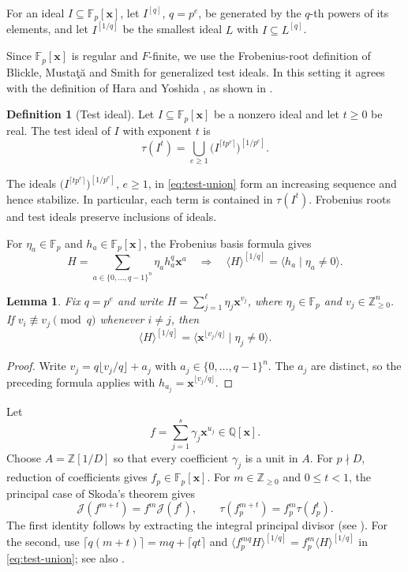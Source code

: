 \documentclass[11pt]{amsart}
\numberwithin{equation}{section}
\newtheorem{lemma}[theorem]{Lemma}
\theoremstyle{definition}
\newtheorem{definition}[theorem]{Definition}
\newcommand{\J}{\mathcal J}
\newcommand{\Q}{\mathbb Q}
\newcommand{\Z}{\mathbb Z}
\newcommand{\F}{\mathbb F}
\newcommand{\xx}{\boldsymbol{x}}
\begin{document}
For an ideal $I\subseteq \F_p[\xx]$, let
$I^{[q]}$, $q=p^e$, be generated by the $q$-th powers of its elements, and let
$I^{[1/q]}$ be the smallest ideal $L$ with $I\subseteq L^{[q]}$.

Since $\F_p[\xx]$ is regular and $F$-finite, we use the
Frobenius-root definition of Blickle, Musta\c{t}\u{a} and Smith
\cite[Definition~2.9]{BMS} for generalized test ideals. 
In this setting it agrees with the definition of Hara and Yoshida \cite{HY}, as shown in
\cite[Proposition~2.22]{BMS}.

\begin{definition}[Test ideal]
Let $I\subseteq \F_p[\xx]$ be a nonzero ideal and let $t\ge0$ be real.
The test ideal of $I$ with exponent $t$ is
\begin{equation}\label{eq:test-union}
 \tau(I^t)=\bigcup_{e\ge1}
          \bigl(I^{\lceil tp^e\rceil}\bigr)^{[1/p^e]}.
\end{equation}
\end{definition}
The ideals $\bigl(I^{\lceil tp^e\rceil}\bigr)^{[1/p^e]}$, $e\ge 1$, in \eqref{eq:test-union} form an increasing sequence and hence
stabilize. In particular, each term is contained in $\tau(I^t)$.
Frobenius roots and test ideals preserve inclusions of ideals.

For $\eta_a\in\F_p$ and $h_a\in\F_p[\xx]$, the Frobenius basis formula
\cite[Proposition~2.5]{BMS} gives
\[
 H=\sum_{a\in\{0,\ldots,q-1\}^n}\eta_a h_a^q\xx^a
 \quad\Longrightarrow\quad
 \langle H\rangle^{[1/q]}=\langle h_a\mid\eta_a\ne0\rangle.
\]

\begin{lemma}\label{lem:froot}
Fix $q=p^e$ and write $H=\sum_{j=1}^{\ell}\eta_j\xx^{v_j}$,
where $\eta_j\in\F_p$ and $v_j\in\Z_{\ge 0}^n$.
If $v_i\not\equiv v_j\pmod q$ whenever $i\ne j$, then
\[
 \langle H\rangle^{[1/q]}
 =\langle \xx^{\lfloor v_j/q\rfloor}\mid \eta_j\ne0\rangle.
\]
\end{lemma}

\begin{proof}
Write $v_j=q\lfloor v_j/q\rfloor+a_j$ with $a_j\in\{0,\ldots,q-1\}^n$.
The $a_j$ are distinct, so the preceding formula applies with
$h_{a_j}=\xx^{\lfloor v_j/q\rfloor}$.
\end{proof}

Let
\begin{equation}\label{eq:f}
f=\sum_{j=1}^s\gamma_j\xx^{u_j}\in\Q[\xx].
\end{equation}
Choose $A=\Z[1/D]$ so that every coefficient $\gamma_j$ is a unit in $A$.
For $p\nmid D$, reduction of coefficients gives $f_p\in\F_p[\xx]$.
For $m\in\Z_{\ge 0}$ and $0\le t<1$, the principal case of Skoda's theorem gives
\begin{equation}\label{eq:skoda}
 \J(f^{m+t})=f^m\J(f^t),\qquad
 \tau(f_p^{m+t})=f_p^m\tau(f_p^t).
\end{equation}
The first identity follows by extracting the integral principal divisor (see \cite[Section~11.1.A]{Laz}).
For the second, use $\lceil q(m+t)\rceil=mq+\lceil qt\rceil$ and
$\langle f_p^{mq}H\rangle^{[1/q]}=f_p^m\langle H\rangle^{[1/q]}$ in
\eqref{eq:test-union}; see also \cite[Proposition~2.25]{BMS}.
\end{document}
